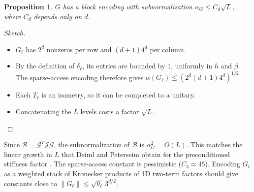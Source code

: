 \documentclass[11pt,a4paper]{article}
\newcommand{\B}{\mathcal{B}}
\newcommand{\G}{\mathcal{G}}
\newcommand{\J}{\mathcal{J}}
\newtheorem{proposition}[theorem]{Proposition}
\theoremstyle{remark}
\begin{document}
\begin{proposition}\label{prop:alphaG}
$G$ has a block encoding with subnormalization $\alpha_G\le C_d\sqrt L$, where
$C_d$ depends only on $d$.
\end{proposition}
\begin{proof}[Sketch]
\begin{itemize}
\item $G_\ell$ has $2^d$ nonzeros per row and $(d+1)4^d$ per column.
\item By the definition of $\delta_\ell$, its entries are bounded by $1$,
  uniformly in $h$ and $\beta$. The sparse-access encoding therefore gives
  $\alpha(G_\ell)\le(2^d(d+1)4^d)^{1/2}$.
\item Each $T_\ell$ is an isometry, so it can be completed to a unitary.
\item Concatenating the $L$ levels costs a factor $\sqrt L$.
\end{itemize}
\end{proof}
Since $\B=\G^T\J\G$, the subnormalization of $\B$ is $\alpha_G^2=O(L)$. This matches
the linear growth in $L$ that Deiml and Peterseim obtain for the
preconditioned stiffness factor \cite[Thm.~6.3]{DP26}.
The sparse-access constant is pessimistic ($C_3\approx45$). Encoding $G_\ell$ as
a weighted stack of Kronecker products of 1D two-term factors should give
constants close to $\|G_\ell\|\le\sqrt{\theta_\ell}\,3^{d/2}$.
\end{document}
